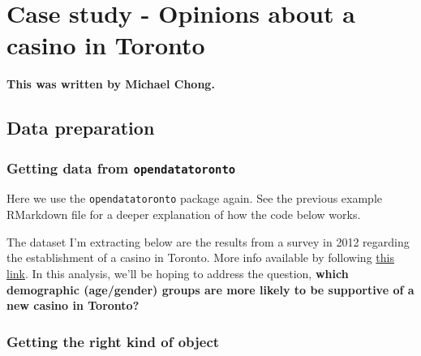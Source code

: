 \documentclass[
]{book}
\newenvironment{Shaded}{\begin{snugshade}}{\end{snugshade}}
\newcommand{\CommentTok}[1]{\textcolor[rgb]{0.56,0.35,0.01}{\textit{#1}}}
\newcommand{\KeywordTok}[1]{\textcolor[rgb]{0.13,0.29,0.53}{\textbf{#1}}}
\newcommand{\NormalTok}[1]{#1}
\newcommand{\OperatorTok}[1]{\textcolor[rgb]{0.81,0.36,0.00}{\textbf{#1}}}
\newcommand{\StringTok}[1]{\textcolor[rgb]{0.31,0.60,0.02}{#1}}
\begin{document}
\hypertarget{case-study---opinions-about-a-casino-in-toronto}{%
\section{Case study - Opinions about a casino in Toronto}\label{case-study---opinions-about-a-casino-in-toronto}}

\textbf{This was written by Michael Chong.}

\hypertarget{data-preparation}{%
\subsection{Data preparation}\label{data-preparation}}

\hypertarget{getting-data-from-opendatatoronto}{%
\subsubsection{\texorpdfstring{Getting data from \texttt{opendatatoronto}}{Getting data from opendatatoronto}}\label{getting-data-from-opendatatoronto}}

Here we use the \texttt{opendatatoronto} package again. See the previous example RMarkdown file for a deeper explanation of how the code below works.

The dataset I'm extracting below are the results from a survey in 2012 regarding the establishment of a casino in Toronto. More info available by following \href{https://open.toronto.ca/dataset/casino-survey-results/}{this link}. In this analysis, we'll be hoping to address the question, \textbf{which demographic (age/gender) groups are more likely to be supportive of a new casino in Toronto?}

\begin{Shaded}
\end{Shaded}

\hypertarget{getting-the-right-kind-of-object}{%
\subsubsection{Getting the right kind of object}\label{getting-the-right-kind-of-object}}
\end{document}
